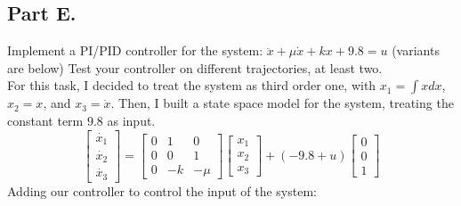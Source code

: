 \documentclass[a4paper,12pt]{article}
\begin{document}
    \subsection*{Part E.}
    Implement a PI/PID controller for the system: 
    $\ddot{x}+\mu \dot{x} +kx+ 9.8 = u$
    (variants are below) Test your controller on different trajectories, at 
    least two.\\
    For this task, I decided to treat the system as third order one, with $x_1 = 
    \int xdx$, $x_2 = x$, and $x_3 = \dot x$. Then, I built a state space model 
    for the system, treating the constant term $9.8$ as input.
    \begin{equation*}
        \begin{bmatrix}
            \dot{x_1}\\
            \dot{x_2}\\
            \dot{x_3}
        \end{bmatrix}
        =
        \begin{bmatrix}
            0 & 1 & 0\\
            0 & 0 & 1\\
            0 & -k & -\mu
        \end{bmatrix}
        \begin{bmatrix}
            x_1\\
            x_2\\
            x_3
        \end{bmatrix}
        + (-9.8 + u)
        \begin{bmatrix}
            0\\
            0\\
            1
        \end{bmatrix}
    \end{equation*}
    Adding our controller to control the input of the system:
\end{document}
